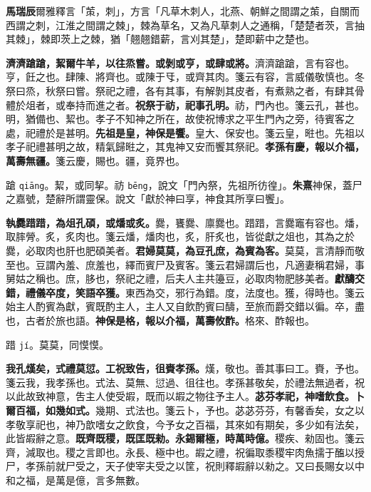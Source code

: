 \begin{quoting}\textbf{馬瑞辰}爾雅釋言「茦，刺」，方言「凡草木刺人，北燕、朝鮮之間謂之茦，自關而西謂之刺，江淮之間謂之棘」，棘為草名，又為凡草刺人之通稱，「楚楚者茨，言抽其棘」，棘即茨上之棘，猶「翹翹錯薪，言刈其楚」，楚即薪中之楚也。\end{quoting}

\textbf{濟濟蹌蹌，絜爾牛羊，以往烝嘗。或剝或亨，或肆或將。}{\footnotesize 濟濟蹌蹌，言有容也。亨，飪之也。肆陳、將齊也。或陳于㸦，或齊其肉。箋云有容，言威儀敬慎也。冬祭曰烝，秋祭曰嘗。祭祀之禮，各有其事，有解剝其皮者，有煮熟之者，有肆其骨體於俎者，或奉持而進之者。}\textbf{祝祭于祊，祀事孔明。}{\footnotesize 祊，門內也。箋云孔，甚也。明，猶備也、絜也。孝子不知神之所在，故使祝博求之平生門內之旁，待賓客之處，祀禮於是甚明。}\textbf{先祖是皇，神保是饗。}{\footnotesize 皇大、保安也。箋云皇，暀也。先祖以孝子祀禮甚明之故，精氣歸暀之，其鬼神又安而饗其祭祀。}\textbf{孝孫有慶，報以介福，萬壽無疆。}{\footnotesize 箋云慶，賜也。疆，竟界也。}

\begin{quoting}蹌 \texttt{qiāng}。絜，或同挈。祊 \texttt{bēng}，說文「門內祭，先祖所彷徨」。\textbf{朱熹}神保，蓋尸之嘉號，楚辭所謂靈保。說文「獻於神曰享，神食其所享曰饗」。\end{quoting}

\textbf{執爨踖踖，為俎孔碩，或燔或炙。}{\footnotesize 爨，饔爨、廪爨也。踖踖，言爨竈有容也。燔，取膟膋。炙，炙肉也。箋云燔，燔肉也，炙，肝炙也，皆從獻之俎也，其為之於爨，必取肉也肝也肥碩美者。}\textbf{君婦莫莫，為豆孔庶，為賓為客。}{\footnotesize 莫莫，言清靜而敬至也。豆謂內羞、庶羞也，繹而賓尸及賓客。箋云君婦謂后也，凡適妻稱君婦，事舅姑之稱也。庶，䏧也，祭祀之禮，后夫人主共籩豆，必取肉物肥䏧美者。}\textbf{獻醻交錯，禮儀卒度，笑語卒獲。}{\footnotesize 東西為交，邪行為錯。度，法度也。獲，得時也。箋云始主人酌賓為獻，賓既酌主人，主人又自飲酌賓曰醻，至旅而爵交錯以徧。卒，盡也，古者於旅也語。}\textbf{神保是格，報以介福，萬壽攸酢。}{\footnotesize 格來、酢報也。}

\begin{quoting}踖 \texttt{jí}。莫莫，同慔慔。\end{quoting}

\textbf{我孔熯矣，式禮莫愆。工祝致告，徂賚孝孫。}{\footnotesize 熯，敬也。善其事曰工。賚，予也。箋云我，我孝孫也。式法、莫無、愆過、徂往也。孝孫甚敬矣，於禮法無過者，祝以此故致神意，吿主人使受嘏，既而以嘏之物往予主人。}\textbf{苾芬孝祀，神嗜飲食。卜爾百福，如幾如式。}{\footnotesize 幾期、式法也。箋云卜，予也。苾苾芬芬，有馨香矣，女之以孝敬享祀也，神乃歆嗜女之飲食，今予女之百福，其來如有期矣，多少如有法矣，此皆嘏辭之意。}\textbf{既齊既稷，既匡既勑。永錫爾極，時萬時億。}{\footnotesize 稷疾、勑固也。箋云齊，減取也。稷之言即也。永長、極中也。嘏之禮，祝徧取黍稷牢肉魚擩于醢以授尸，孝孫前就尸受之，天子使宰夫受之以筐，祝則釋嘏辭以勑之。又曰長賜女以中和之福，是萬是億，言多無數。}

